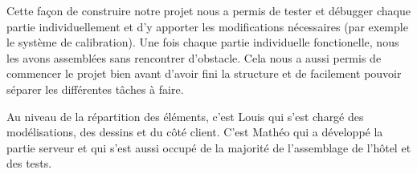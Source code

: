Cette façon de construire notre projet nous a permis de tester et débugger chaque partie individuellement et d'y apporter les modifications nécessaires (par exemple le système de calibration).
Une fois chaque partie individuelle fonctionelle, nous les avons assemblées sans rencontrer d'obstacle.
Cela nous a aussi permis de commencer le projet bien avant d'avoir fini la structure et de facilement pouvoir séparer les différentes tâches à faire.

Au niveau de la répartition des éléments, c'est Louis qui s'est chargé des modélisations, des dessins et du côté client. C'est Mathéo qui a développé la partie serveur et qui s'est aussi occupé de la majorité de l'assemblage de l'hôtel et des tests.
